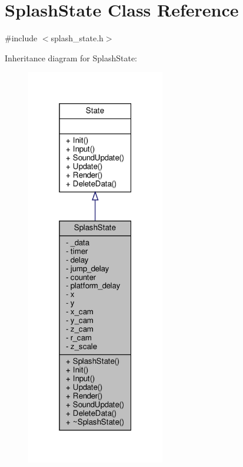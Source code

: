 \hypertarget{classSplashState}{}\section{Splash\+State Class Reference}
\label{classSplashState}


{\ttfamily \#include $<$splash\+\_\+state.\+h$>$}



Inheritance diagram for Splash\+State\+:
\nopagebreak
\begin{figure}[H]
\begin{center}
\leavevmode
\includegraphics[width=171pt]{classSplashState__inherit__graph}
\end{center}
\end{figure}


